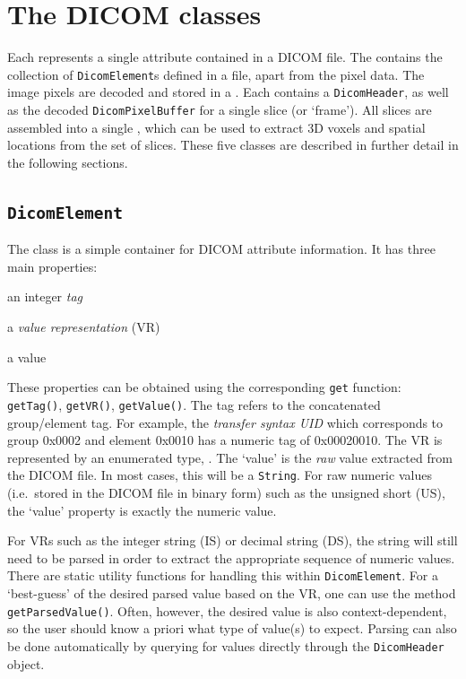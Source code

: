 \section{The DICOM classes}

Each  represents a single attribute contained in a DICOM file.
The  contains the collection of \lstinline{DicomElement}s defined in a file, 
apart from the pixel data.  The image pixels are decoded and stored in a .  
Each  contains a \lstinline{DicomHeader}, as well as
the decoded \lstinline{DicomPixelBuffer} for a single slice (or `frame').  All slices are assembled into a single 
, which can be used to extract 3D voxels and spatial locations from the set of slices.  
These five classes are described in further detail in the following sections.

\subsection{\texttt{DicomElement}}

The  class is a simple container for DICOM attribute information.  It has
three main properties:
\begin{tightemize}
\item an integer \emph{tag}
\item a \emph{value representation} (VR)
\item a value
\end{tightemize}
These properties can be obtained using the corresponding \lstinline{get} function: \lstinline{getTag()}, \lstinline{getVR()}, \lstinline{getValue()}.  The tag refers to the concatenated group/element tag. For example, the \emph{transfer syntax UID} which corresponds to group 0x0002 and element 0x0010 has a numeric tag of 0x00020010. The VR is represented by an enumerated type, .  The `value' is the \emph{raw} value extracted from the DICOM file.  In most cases, this will be a \lstinline{String}.  For raw numeric values (i.e.~stored in the DICOM file in binary form) such as the unsigned short (US), the `value' property is exactly the numeric value.

For VRs such as the integer string (IS) or decimal string (DS), the string will still need to be parsed in order to extract the appropriate sequence of numeric values.  There are static utility functions for handling this within \lstinline{DicomElement}.  For a `best-guess' of the desired parsed value based on the VR, one can use the method \lstinline{getParsedValue()}.  Often, however, the desired value is also context-dependent, so the user should know a priori what type of value(s) to expect.  Parsing can also be done automatically by querying for values directly through the \lstinline{DicomHeader} object.  

